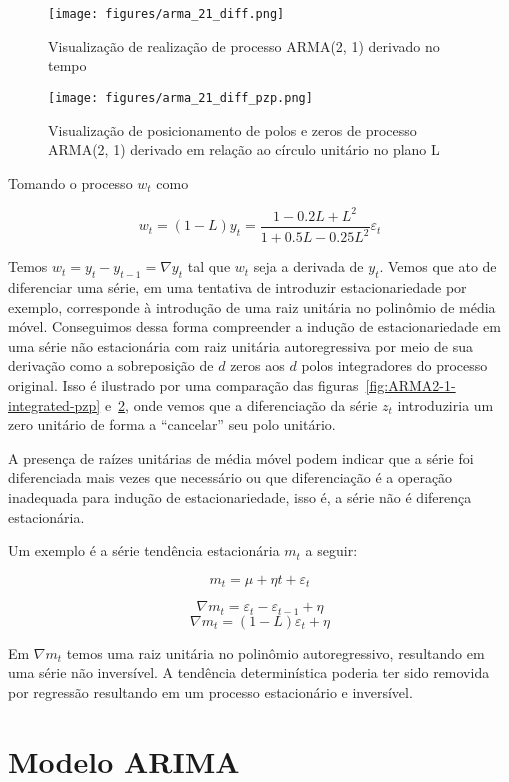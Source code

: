 \begin{figure}[H]
    \centering
    \texttt{[image: figures/arma\_21\_diff.png]}
    \caption{Visualização de realização de processo ARMA(2, 1) derivado
    no tempo}
    \label{fig:ARMA2-1-diff}
\end{figure}

\begin{figure}[H]
    \centering
    \texttt{[image: figures/arma\_21\_diff\_pzp.png]}
    \caption{Visualização de posicionamento de polos e zeros de processo
    ARMA(2, 1) derivado em relação ao círculo unitário no plano L}
    \label{fig:ARMA2-1-diff-pzp}
\end{figure}

Tomando o processo $w_t$ como

$$ w_t = (1 - L)y_t = \frac{1 - 0.2L + L^2}{1 + 0.5L - 0.25L^2}\varepsilon_t$$

Temos $w_t = y_t - y_{t-1} = \nabla y_t$ tal que $w_t$ seja a derivada de
$y_t$. Vemos que ato de diferenciar uma série, em uma tentativa de introduzir
estacionariedade por exemplo, corresponde à introdução de uma raiz unitária no
polinômio de média móvel. Conseguimos dessa forma compreender a indução de
estacionariedade em uma série não estacionária com raiz unitária autoregressiva
por meio de sua derivação como a sobreposição de $d$ zeros aos $d$ polos
integradores do processo original. Isso é ilustrado por uma comparação das
figuras~\ref{fig:ARMA2-1-integrated-pzp} e~\ref{fig:ARMA2-1-diff-pzp}, onde
vemos que a diferenciação da série $z_t$ introduziria um zero unitário de forma
a ``cancelar'' seu polo unitário.

A presença de raízes unitárias de média móvel podem indicar que a série foi
diferenciada mais vezes que necessário ou que diferenciação é a operação
inadequada para indução de estacionariedade, isso é, a série não é diferença
estacionária.

Um exemplo é a série tendência estacionária $m_t$ a seguir:

$$ m_t = \mu + \eta t + \varepsilon_t $$

$$ \nabla m_t = \varepsilon_t - \varepsilon_{t-1} + \eta $$
$$ \nabla m_t = (1 - L)\varepsilon_t + \eta $$

Em $\nabla m_t$ temos uma raiz unitária no polinômio autoregressivo, resultando
em uma série não inversível. A tendência determinística poderia ter sido
removida por regressão resultando em um processo estacionário e inversível.


\section{Modelo ARIMA}
\label{sec:ARIMA}

